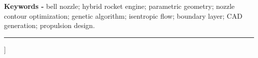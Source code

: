 \documentclass[11pt,a4paper]{article}
\begin{document}
\vspace{0.8em}

\noindent\textbf{Keywords -}
bell nozzle; hybrid rocket engine; parametric geometry; nozzle contour optimization; genetic algorithm; isentropic flow; boundary layer; CAD generation; propulsion design.

\vspace{1em}
\noindent\rule{\linewidth}{0.4pt}
\vspace{1em}
]

\onecolumn
\newpage
\tableofcontents

\newpage
\listoffigures

\newpage



\newpage


\newpage


\newpage


\newpage


\newpage



\newpage



\newpage


\newpage


% 

\newpage


\newpage



\newpage

\newpage

\newpage

\end{document}
